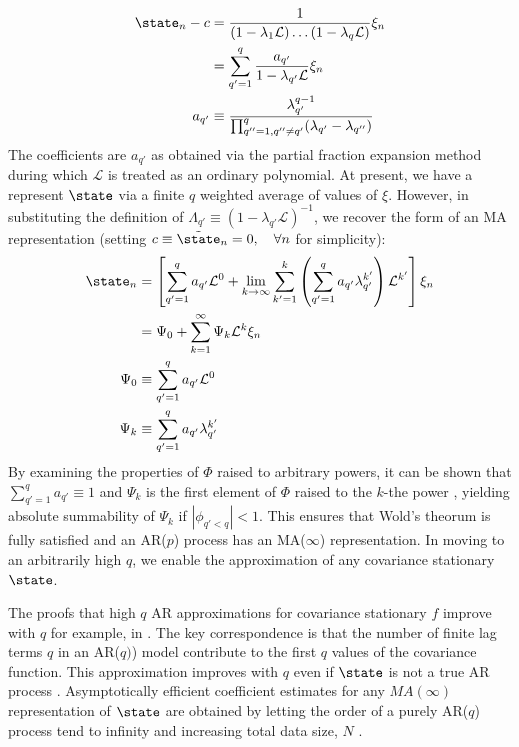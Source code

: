 \begin{align}
\state_n - c & = \frac{1}{(1 - \lambda_1 \mathcal{L}) \hdots (1 - \lambda_q \mathcal{L})} \xi_n\\
& = \sum_{q'=1}^{q}\frac{a_{q'}}{1- \lambda_{q'} \mathcal{L}} \xi_n \\
a_{q'} & \equiv \frac{\lambda_{q'}^{q-1}}{\prod_{q''=1, q''\neq q'}^{q} (\lambda_{q'} - \lambda_{q''})}
\end{align} The coefficients are $a_{q'}$ as obtained via the partial fraction expansion method during which $\mathcal{L}$ is treated as an ordinary polynomial. At present, we have a represent $\state$ via a finite $q$ weighted average of values of $\xi$. However, in substituting the definition of $ \Lambda_{q'} \equiv (1- \lambda_{q'} \mathcal{L})^{-1}$, we recover the form of an MA representation (setting $c \equiv \tilde{\state}_n  = 0, \quad  \forall n$ for simplicity): 
\begin{align}
\state_n & = \left[ \sum_{q'=1}^{q} a_{q'} \mathcal{L}^0 +  \lim_{k \to \infty}  \sum_{k'=1}^{k} \left( \sum_{q'=1}^{q} a_{q'}  \lambda_{q'}^{k'} \right) \mathcal{L}^{k'}\right] \xi_n \\
& = \Psi_0 + \sum_{k=1}^{\infty} \Psi_k \mathcal{L}^k \xi_{n}  \\
\Psi_0 & \equiv \sum_{q'=1}^{q} a_{q'} \mathcal{L}^0  \\
\Psi_k & \equiv \sum_{q'=1}^{q} a_{q'}  \lambda_{q'}^{k'}
\end{align}
By examining the properties of $\Phi$ raised to arbitrary powers, it can be shown that $\sum_{q'=1}^{q} a_{q'} \equiv 1$ and $\Psi_k$ is the first element of $\Phi$ raised to the $k$-the power \cite{hamilton1994time}, yielding absolute summability of $\Psi_k$ if $|\phi_{q'<q}| < 1$. This ensures that Wold's theorum is fully satisfied and an AR($p$) process has an MA($\infty$) representation. In moving to an arbitrarily high $q$, we enable the approximation of any covariance stationary $\state$.

The proofs that high $q$ AR approximations for covariance stationary $f$ improve with $q$ for example, in \cite{wahlberg1989estimation}. The key correspondence is that the number of finite lag terms $q$ in an AR($q)$) model contribute to the first $q$ values of the covariance function. This approximation improves with $q$ even if $\state$ is not a true AR process \cite{wahlberg1989estimation,west1996bayesian}. Asymptotically efficient coefficient estimates for any $MA(\infty)$ representation of $\state$ are obtained by letting the order of a purely AR($q$) process tend to infinity and increasing total data size, $N$ \cite{wahlberg1989estimation}. 

